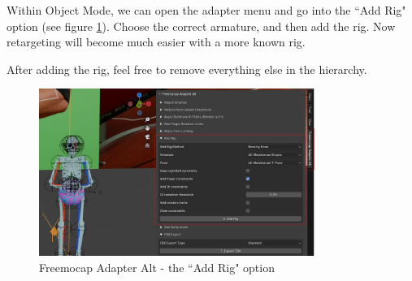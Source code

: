 \documentclass{uva-inf-article}
\begin{document}
Within Object Mode, we can open the adapter menu and go into the ``Add Rig" option (see figure \ref{fig:rigifyfreemocap}). Choose the correct armature, and then add the rig. Now retargeting will become much easier with a more known rig.

After adding the rig, feel free to remove everything else in the hierarchy.
\begin{figure}[hbt!]
    \centering
    \includegraphics[width=0.8\textwidth]{imgs/rigify.png}
    \caption{Freemocap Adapter Alt - the ``Add Rig" option}
    \label{fig:rigifyfreemocap}
\end{figure}
\end{document}
